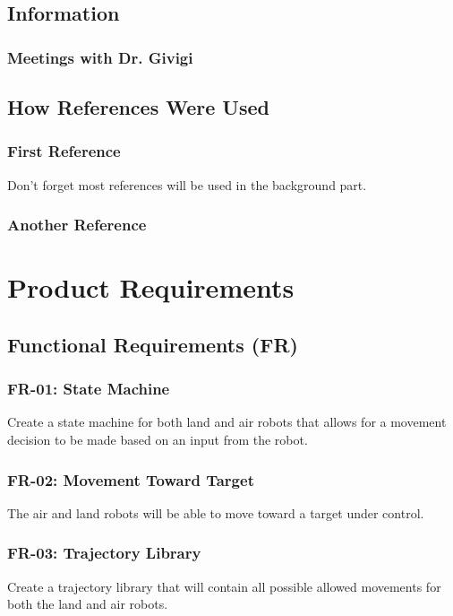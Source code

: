 \documentclass[]{report}
\begin{document}
\section{Information}

\subsection{Meetings with Dr. Givigi}

\section{How References Were Used}

\subsection{First Reference}
Don't forget most references will be used in the background part. 

\subsection{Another Reference}


\chapter{Product Requirements}

\section{Functional Requirements (FR)}

\subsection{FR-01: State Machine}
Create a state machine for both land and air robots that allows for a movement decision to be made based on an input from the robot. 

\subsection{FR-02: Movement Toward Target}
The air and land robots will be able to move toward a target under control.

\subsection{FR-03: Trajectory Library}
Create a trajectory library that will contain all possible allowed movements for both the land and air robots.
\end{document}
